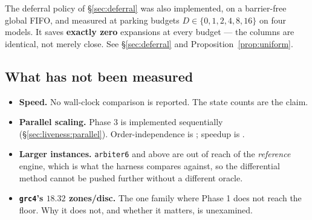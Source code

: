 The deferral policy of \S\ref{sec:deferral} was also implemented, on a barrier-free global FIFO,
and measured at parking budgets $D \in \{0,1,2,4,8,16\}$ on four models. It saves \textbf{exactly
zero} expansions at every budget --- the columns are identical, not merely close. See
\S\ref{sec:deferral} and Proposition~\ref{prop:uniform}.

\subsection{What has not been measured}

\begin{itemize}
  \item \textbf{Speed.} No wall-clock comparison is reported. The state counts are the claim.
  \item \textbf{Parallel scaling.} Phase 3 is implemented sequentially
        (\S\ref{sec:liveness:parallel}). Order-independence is \proved{}; speedup is \openq{}.
  \item \textbf{Larger instances.} \texttt{arbiter6} and above are out of reach of the
        \emph{reference} engine, which is what the harness compares against, so the differential
        method cannot be pushed further without a different oracle.
  \item \textbf{\texttt{grc4}'s $18.32$ zones/disc.} The one family where Phase 1 does not reach the
        floor. Why it does not, and whether it matters, is unexamined.
\end{itemize}
